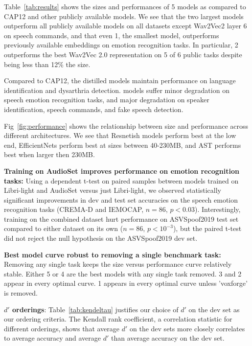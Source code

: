 

Table~\ref{tab:results} shows the sizes and performances of 5 \trillsson{} models as compared to CAP12 and other publicly available models. We see that the two largest \trillsson{} models outperform all publicly available models on all datasets except Wav2Vec2 layer 6 on speech commands, and that even \trillsson{}1, the smallest model, outperforms previously available embeddings on emotion recognition tasks. In particular, \trillsson{}2 outperforms the best Wav2Vec 2.0 representation on 5 of 6 public tasks despite being less than 12\% the size.

Compared to CAP12, the distilled models maintain performance on language identification and dysarthria detection. \trillsson{} models suffer minor degradation on speech emotion recognition tasks, and major degradation on speaker identification, speech commands, and fake speech detection.

Fig~\ref{fig:performance} shows the relationship between size and performance across different architectures. We see that Resnetish models perform best at the low end, EfficientNets perform best at sizes between 40-230MB, and AST performs best when larger then 230MB.

\textbf{Training on AudioSet improves performance on emotion recognition tasks:} Using a dependent t-test on paired samples between models trained on Libri-light and AudioSet versus just Libri-light, we observed statistically significant improvements in dev and test set accuracies on the speech emotion recognition tasks (CREMA-D and IEMOCAP, $n=86$, $p<0.03$). Interestingly, training on the combined dataset hurt performance on ASVSpoof2019 test set compared to either dataset on its own ($n=86$, $p<10^{-3}$), but the paired t-test did not reject the null hypothesis on the ASVSpoof2019 dev set.

\textbf{Best model curve robust to removing a single benchmark task:} Removing any single task keeps the size versus performance curve relatively stable. Either \trillsson{}5 or 4 are the best models with any single task removed. \trillsson{}3 and 2 appear in every optimal curve. \trillsson{}1 appears in every optimal curve unless 'voxforge' is removed.



\textbf{$d'$ orderings}: Table~\ref{tab:kendeltau} justifies our choice of $d'$ on the dev set as our ordering criteria. The Kendall rank coefficient, a correlation statistic for different orderings, shows that average $d'$ on the dev sets more closely correlates to average accuracy and average $d'$ than average accuracy on the dev set.

